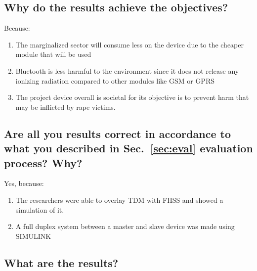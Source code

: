 \subsection{Why do the results achieve the objectives?}
Because:
\begin{enumerate}
	\item The marginalized sector will consume less on the device due to the cheaper module that will be used 
	
	\item Bluetooth is less harmful to the environment since
	it does not release any ionizing radiation compared
	to other modules like GSM or GPRS
	
	\item The project device overall is societal for its objective is to prevent harm that may be inflicted by rape victims.
	
\end{enumerate}

\subsection{Are all you results correct  in accordance to what you described in Sec.~\ref{sec:eval} evaluation process? Why?} 
Yes, because:
\begin{enumerate}
	\item The researchers were able to overlay TDM with FHSS and showed a simulation of it.
	\item A full duplex system between a master and slave device was made using SIMULINK
\end{enumerate}

\subsection{What are the results?}

